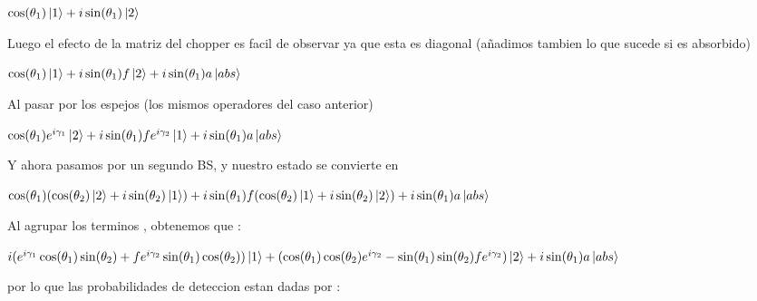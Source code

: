 \documentclass[11pt]{article}
\begin{document}
$\cos(\theta_{1})\ket{1}+i\sin(\theta_{1})\ket{2}$

Luego el efecto de la matriz del chopper es facil de observar ya que esta es diagonal (añadimos tambien lo que sucede si es absorbido)

$\cos(\theta_{1})\ket{1}+i\sin(\theta_{1})f\ket{2}+i\sin(\theta_{1})a\ket{abs}$

Al pasar por los espejos (los mismos operadores del caso anterior)

$\cos(\theta_{1})e^{i\gamma_{1}}\ket{2}+i\sin(\theta_{1})f e^{i\gamma_{2}}\ket{1}+i\sin(\theta_{1})a\ket{abs}$

Y ahora pasamos por un segundo BS, y nuestro estado se convierte en 

$\cos(\theta_{1})(\cos(\theta_{2})\ket{2}+i\sin(\theta_{2})\ket{1})+i\sin(\theta_{1})f(\cos(\theta_{2})\ket{1}+i\sin(\theta_{2})\ket{2})+i\sin(\theta_{1})a\ket{abs}$

Al agrupar los terminos , obtenemos que :

$i(e^{i\gamma_{1}}\cos(\theta_{1})\sin(\theta_{2})+f e^{i\gamma_{2}}\sin(\theta_{1})\cos(\theta_{2}))\ket{1}
+(\cos(\theta_{1})\cos(\theta_{2}) e^{i\gamma_{2}}-\sin(\theta_{1})\sin(\theta_{2})f e^{i \gamma_{2}})\ket{2}+i\sin(\theta_{1})a\ket{abs}$

por lo que las probabilidades de deteccion estan dadas por :
\end{document}
